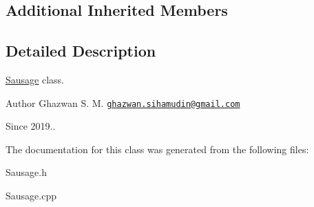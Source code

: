 \subsection*{Additional Inherited Members}


\subsection{Detailed Description}
\hyperlink{classSausage}{Sausage} class.

\begin{DoxyAuthor}{Author}
Ghazwan S. M. \href{mailto:ghazwan.sihamudin@gmail.com}{\tt ghazwan.\+sihamudin@gmail.\+com} 
\end{DoxyAuthor}
\begin{DoxySince}{Since}
2019.. 
\end{DoxySince}


The documentation for this class was generated from the following files\+:\begin{DoxyCompactItemize}
\item 
Sausage.\+h\item 
Sausage.\+cpp\end{DoxyCompactItemize}
